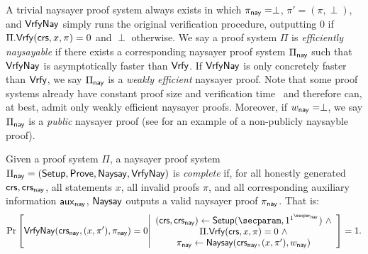 A trivial naysayer proof system always exists in which $\pi_{\mathsf{nay}} = \perp$, $\pi' = (\pi, \perp)$, and ${\mathsf{Vrfy}}\mathsf{Nay}$ simply runs the original verification procedure, outputting $0$ if $\Pi.\mathsf{Vrfy}(\mathsf{crs}, x, \pi) = 0$ and $\perp$ otherwise.
We say a proof system $\Pi$ is \emph{efficiently naysayable} if there exists a corresponding naysayer proof system $\Pi_{\mathsf{nay}}$ such that ${\mathsf{Vrfy}}\mathsf{Nay}$ is asymptotically faster than $\mathsf{Vrfy}$. If ${\mathsf{Vrfy}}\mathsf{Nay}$ is only concretely faster than $\mathsf{Vrfy}$, we say $\Pi_{\mathsf{nay}}$ is a \emph{weakly efficient} naysayer proof. Note that some proof systems already have constant proof size and verification time~\cite{EC:Groth16,C:Schnorr89} and therefore can, at best, admit only weakly efficient naysayer proofs. 
Moreover, if $w_{\mathsf{nay}} = \perp$, we say $\Pi_{\mathsf{nay}}$ is a \emph{public} naysayer proof (see  for an example of a non-publicly naysayble proof). 

\begin{definition}
    Given a proof system $\Pi$, a naysayer proof system $\Pi_{\mathsf{nay}} = (\mathsf{Setup}, \mathsf{Prove}, \mathsf{Naysay}, {\mathsf{Vrfy}}\mathsf{Nay})$ is \emph{complete} if, for all honestly generated $\mathsf{crs}, \mathsf{crs}_{\mathsf{nay}}$, all statements $x$, all invalid proofs $\pi$, and all corresponding auxiliary information $\mathsf{aux}_{\mathsf{nay}}$, $\mathsf{Naysay}$ outputs a valid naysayer proof $\pi_{\mathsf{nay}}$. That is:
\begin{equation*}
    \Pr\left[
        \vrfynay(\crs_{\nay}, (x,\pi'), \pi_{\nay})=0 
        \middle| 
        \begin{array}{c}
            (\crs, \crs_{\nay}) \gets \setup(\secparam, 1^{\naysecparam})~\land\\
            \Pi.\vrfy(\crs, x,\pi)=0~\land\\
            \pi_{\nay} \gets \naysay(\crs_{\nay}, (x, \pi'), \witness_{\nay})
        \end{array}
    \right] = 1.
\end{equation*}
\end{definition}

